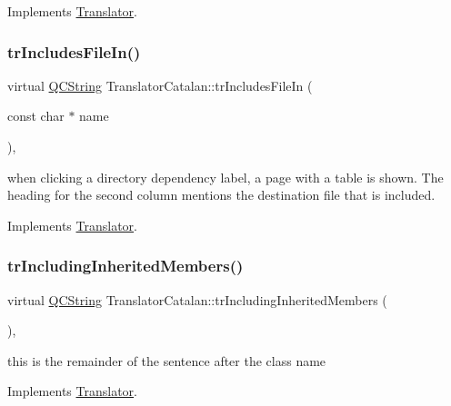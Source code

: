 Implements \mbox{\hyperlink{class_translator}{Translator}}.

\mbox{\label{class_translator_catalan_a8325005bd0f609f86413e9263151d871}} 
\subsubsection{\texorpdfstring{trIncludesFileIn()}{trIncludesFileIn()}}
{\footnotesize\ttfamily virtual \mbox{\hyperlink{class_q_c_string}{Q\+C\+String}} Translator\+Catalan\+::tr\+Includes\+File\+In (\begin{DoxyParamCaption}\item[{const char $\ast$}]{name }\end{DoxyParamCaption})\hspace{0.3cm}{\ttfamily [inline]}, {\ttfamily [virtual]}}

when clicking a directory dependency label, a page with a table is shown. The heading for the second column mentions the destination file that is included. 

Implements \mbox{\hyperlink{class_translator}{Translator}}.

\mbox{\label{class_translator_catalan_af7d30e3dba74a677be99433e2b864610}} 
\subsubsection{\texorpdfstring{trIncludingInheritedMembers()}{trIncludingInheritedMembers()}}
{\footnotesize\ttfamily virtual \mbox{\hyperlink{class_q_c_string}{Q\+C\+String}} Translator\+Catalan\+::tr\+Including\+Inherited\+Members (\begin{DoxyParamCaption}{ }\end{DoxyParamCaption})\hspace{0.3cm}{\ttfamily [inline]}, {\ttfamily [virtual]}}

this is the remainder of the sentence after the class name 

Implements \mbox{\hyperlink{class_translator}{Translator}}.

